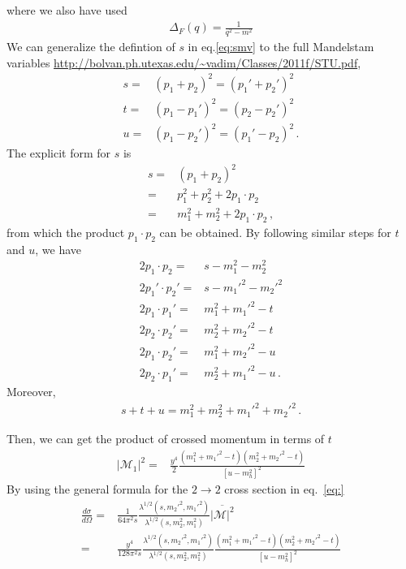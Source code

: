 where we also have used
\begin{align}
  \Delta_F(q)=\frac{1}{q^2-m^2}
\end{align}
We can generalize the defintion of $s$ in eq.\eqref{eq:smv} to the full
Mandelstam variables \url{http://bolvan.ph.utexas.edu/~vadim/Classes/2011f/STU.pdf},
\begin{align}
  s=&\left( p_1+p_2 \right)^2=\left( p_1'+p_2' \right)^2 \nonumber\\
  t=&\left( p_1-p_1' \right)^2=\left( p_2-p_2' \right)^2 \nonumber\\
  u=&\left( p_1-p_2' \right)^2=\left( p_1'-p_2 \right)^2 \,.
\end{align}
The explicit form for $s$ is
\begin{align}
  s=&\left( p_1+p_2 \right)^2 \nonumber\\
 =& p_1^2+p_2^2+2 p_1\cdot p_2 \nonumber\\
=& m_1^2+m_2^2+2 p_1\cdot p_2\,,
\end{align}
from which the product $p_1\cdot p_2$ can be obtained.  By following similar steps for $t$ and $u$, we have
\begin{align}
  2 p_1\cdot p_2=&s- m_1^2-m_2^2 \nonumber\\
  2 p_1'\cdot p_2'=&s- {m_1'}^2-{m_2'}^2 \nonumber\\
  2 p_1\cdot p_1'=&m_1^2+{m_1'}^2 -t \nonumber\\
  2 p_2\cdot p_2'=&m_2^2+{m_2'}^2 -t \nonumber\\
  2 p_1\cdot p_2'=&m_1^2+{m_2'}^2 -u \nonumber\\
  2 p_2\cdot p_1'=&m_2^2+{m_1'}^2 -u \,.
\end{align}
Moreover,
\begin{align}
  s+t+u=m_1^2+m_2^2+{m_1'}^2+{m_2'}^2\,.
\end{align}

Then, we can get the product of crossed momentum in terms of $t$
\begin{align}
  \left| \mathcal{M}_1 \right|^2 = & \frac{y^4}{2}  \frac{ \left(m_1^2+{m_1'}^2-t  \right)\left( m_2^2+{m_2'}^2-t \right)}{\left[ u-m^2_h \right]^2}
\end{align}
By using the general formula for the $2\to 2$ cross section in eq.~\eqref{eq:}
\begin{align}
  \frac{d\sigma}{d\Omega}=&\frac{1}{64\pi^2s}
\frac{\lambda^{1/2}(s,{m_2'}^2,{m_1'}^2)}{\lambda^{1/2}(s,m_2^2,m_1^2)}
\overline{|\mathcal{M}|^2} \nonumber\\
=&\frac{y^4}{128\pi^2s}
\frac{\lambda^{1/2}(s,{m_2'}^2,{m_1'}^2)}{\lambda^{1/2}(s,m_2^2,m_1^2)}
 \frac{ \left(m_1^2+{m_1'}^2-t  \right)\left( m_2^2+{m_2'}^2-t \right)}{\left[ u-m^2_h \right]^2}
\end{align}

